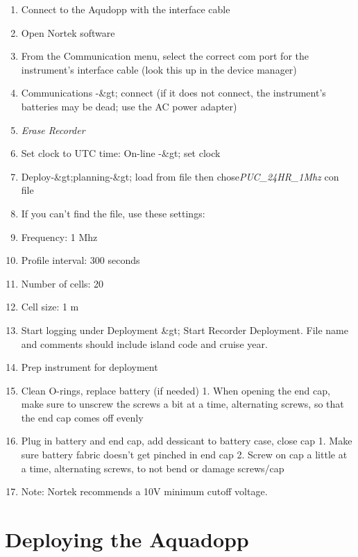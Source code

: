 \documentclass[
]{book}
\providecommand{\tightlist}{%
  \setlength{\itemsep}{0pt}\setlength{\parskip}{0pt}}
\begin{document}
\begin{enumerate}
\def\labelenumi{\arabic{enumi}.}
\tightlist
\item
  Connect to the Aqudopp with the interface cable
\item
  Open Nortek software
\item
  From the Communication menu, select the correct com port for the instrument's interface cable (look this up in the device manager)
\item
  Communications -\&gt; connect (if it does not connect, the instrument's batteries may be dead; use the AC power adapter)
\item
  \emph{Erase Recorder}
\item
  Set clock to UTC time: On-line -\&gt; set clock
\item
  Deploy-\&gt;planning-\&gt; load from file then chose\emph{PUC\_24HR\_1Mhz} con file
\item
  If you can't find the file, use these settings:
\item
  Frequency: 1 Mhz
\item
  Profile interval: 300 seconds
\item
  Number of cells: 20
\item
  Cell size: 1 m
\item
  Start logging under Deployment \&gt; Start Recorder Deployment. File name and comments should include island code and cruise year.
\item
  Prep instrument for deployment
\item
  Clean O-rings, replace battery (if needed)
  1. When opening the end cap, make sure to unscrew the screws a bit at a time, alternating screws, so that the end cap comes off evenly
\item
  Plug in battery and end cap, add dessicant to battery case, close cap
  1. Make sure battery fabric doesn't get pinched in end cap
  2. Screw on cap a little at a time, alternating screws, to not bend or damage screws/cap
\item
  Note: Nortek recommends a 10V minimum cutoff voltage.
\end{enumerate}

\hypertarget{deploying-the-aquadopp}{%
\section{Deploying the Aquadopp}\label{deploying-the-aquadopp}}
\end{document}
